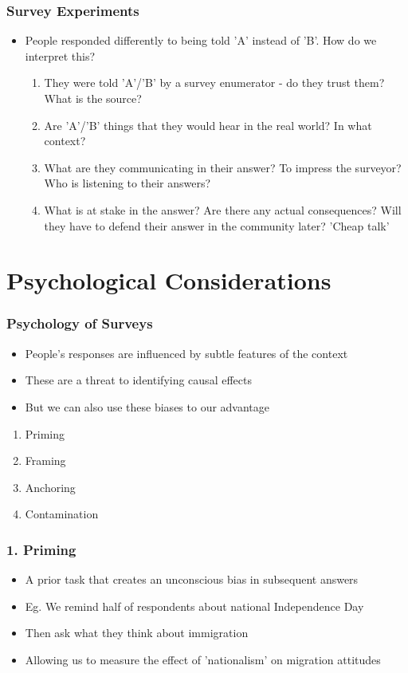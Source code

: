 \documentclass[xcolor=x11names,compress]{beamer}\usepackage[]{graphicx}\usepackage[]{color}
\renewcommand{\(}{\begin{columns}}
\renewcommand{\)}{\end{columns}}
\newcommand{\<}[1]{\begin{column}{#1}}
\renewcommand{\>}{\end{column}}
\begin{document}
\begin{frame}
\frametitle{Survey Experiments}
\begin{itemize}
\item People responded differently to being told 'A' instead of 'B'. How do we interpret this?
\pause
\begin{enumerate}
\item They were told 'A'/'B' by a survey enumerator - do they trust them? What is the source? 
\pause
\item Are 'A'/'B' things that they would hear in the real world? In what context?
\pause
\item What are they communicating in their answer? To impress the surveyor? Who is listening to their answers? 
\pause
\item What is at stake in the answer? Are there any actual consequences? Will they have to defend their answer in the community later? 'Cheap talk'
\end{enumerate}
\end{itemize}
\end{frame}

\section{Psychological Considerations}

\begin{frame}
\frametitle{Psychology of Surveys}
\begin{itemize}
\item People's responses are influenced by subtle features of the context
\pause
\item These are a threat to identifying causal effects
\pause
\item But we can also use these biases to our advantage
\end{itemize}
\begin{enumerate}
\item Priming
\item Framing
\item Anchoring
\item Contamination
\end{enumerate}
\end{frame}

\begin{frame}
\frametitle{1. Priming}
\begin{itemize}
\item A prior task that creates an unconscious bias in subsequent answers
\pause
\item Eg. We remind half of respondents about national Independence Day
\item Then ask what they think about immigration
\item Allowing us to measure the effect of 'nationalism' on migration attitudes
\end{itemize}
\end{frame}
\end{document}
